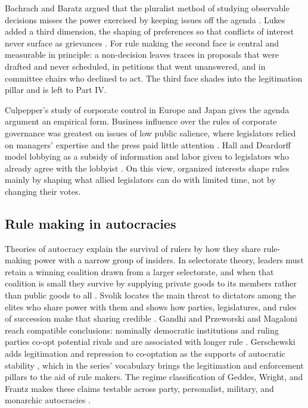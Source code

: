 \documentclass[11pt,letterpaper]{article}
\theoremstyle{definition}
\theoremstyle{remark}
\begin{document}
Bachrach and Baratz argued that the pluralist method of studying observable decisions misses the power exercised by keeping issues off the agenda \citep{bachrach1962}. Lukes added a third dimension, the shaping of preferences so that conflicts of interest never surface as grievances \citep{lukes2005}. For rule making the second face is central and measurable in principle: a non-decision leaves traces in proposals that were drafted and never scheduled, in petitions that went unanswered, and in committee chairs who declined to act. The third face shades into the legitimation pillar and is left to Part IV.

Culpepper's study of corporate control in Europe and Japan gives the agenda argument an empirical form. Business influence over the rules of corporate governance was greatest on issues of low public salience, where legislators relied on managers' expertise and the press paid little attention \citep{culpepper2010}. Hall and Deardorff model lobbying as a subsidy of information and labor given to legislators who already agree with the lobbyist \citep{hall2006}. On this view, organized interests shape rules mainly by shaping what allied legislators can do with limited time, not by changing their votes.

\subsection{Rule making in autocracies}

Theories of autocracy explain the survival of rulers by how they share rule-making power with a narrow group of insiders. In selectorate theory, leaders must retain a winning coalition drawn from a larger selectorate, and when that coalition is small they survive by supplying private goods to its members rather than public goods to all \citep{bdm2003}. Svolik locates the main threat to dictators among the elites who share power with them and shows how parties, legislatures, and rules of succession make that sharing credible \citep{svolik2012}. Gandhi and Przeworski and Magaloni reach compatible conclusions: nominally democratic institutions and ruling parties co-opt potential rivals and are associated with longer rule \citep{gandhi2007,magaloni2008}. Gerschewski adds legitimation and repression to co-optation as the supports of autocratic stability \citep{gerschewski2013}, which in the series' vocabulary brings the legitimation and enforcement pillars to the aid of rule makers. The regime classification of Geddes, Wright, and Frantz makes these claims testable across party, personalist, military, and monarchic autocracies \citep{geddes2014}.
\end{document}
